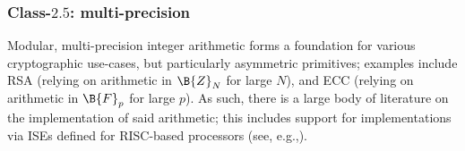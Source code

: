 %
%
%
%




\subsubsection{Class-$2.5$: multi-precision}
\label{sec:bg:feature:2:5}

%
%

Modular, multi-precision integer arithmetic forms a foundation for various
cryptographic use-cases, but particularly asymmetric primitives; examples 
include
RSA (relying on arithmetic in $\B{Z}_N$ for large $N$),
and
ECC (relying on arithmetic in $\B{F}_p$ for large $p$).
As such, there is a large body of literature on the implementation of said 
arithmetic; this includes support for implementations via ISEs defined for 
RISC-based processors
(see, e.g.,\cite{SCARV:GroKam:03,SCARV:GroKam:04}).

